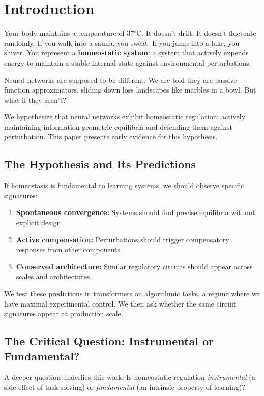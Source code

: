 \section{Introduction}

Your body maintains a temperature of 37$^\circ$C. It doesn't drift. It doesn't fluctuate randomly. If you walk into a sauna, you sweat. If you jump into a lake, you shiver. You represent a \textbf{homeostatic system}: a system that actively expends energy to maintain a stable internal state against environmental perturbations.

Neural networks are supposed to be different. We are told they are passive function approximators, sliding down loss landscapes like marbles in a bowl. But what if they aren't?

We hypothesize that neural networks exhibit homeostatic regulation: actively maintaining information-geometric equilibria and defending them against perturbation. This paper presents early evidence for this hypothesis.

\subsection{The Hypothesis and Its Predictions}

If homeostasis is fundamental to learning systems, we should observe specific signatures:
\begin{enumerate}
    \item \textbf{Spontaneous convergence:} Systems should find precise equilibria without explicit design.
    \item \textbf{Active compensation:} Perturbations should trigger compensatory responses from other components.
    \item \textbf{Conserved architecture:} Similar regulatory circuits should appear across scales and architectures.
\end{enumerate}

We test these predictions in transformers on algorithmic tasks, a regime where we have maximal experimental control. We then ask whether the same circuit signatures appear at production scale.

\subsection{The Critical Question: Instrumental or Fundamental?}

A deeper question underlies this work: Is homeostatic regulation \emph{instrumental} (a side effect of task-solving) or \emph{fundamental} (an intrinsic property of learning)?

